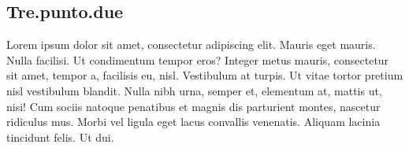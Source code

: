 \subsection{Tre.punto.due}

Lorem ipsum dolor sit amet, consectetur adipiscing elit. Mauris eget mauris.
Nulla facilisi. Ut condimentum tempor eros? Integer metus mauris, consectetur
sit amet, tempor a, facilisis eu, nisl. Vestibulum at turpis. Ut vitae tortor
pretium nisl vestibulum blandit. Nulla nibh urna, semper et, elementum at,
mattis ut, nisi! Cum sociis natoque penatibus et magnis dis parturient montes,
nascetur ridiculus mus. Morbi vel ligula eget lacus convallis venenatis. Aliquam
lacinia tincidunt felis. Ut dui.
